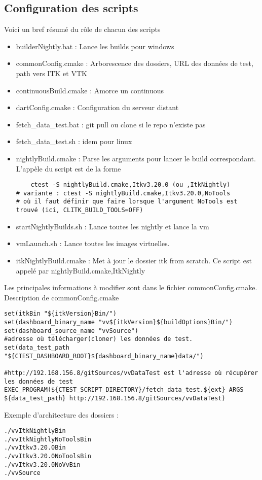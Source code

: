 \documentclass[12pt]{report}
\begin{document}
\subsection{Configuration des scripts}
Voici un bref résumé du rôle de chacun des scripts
\begin{itemize} 
 \item builderNightly.bat : Lance les builds pour windows
 \item commonConfig.cmake : Arborescence des dossiers, URL des données de test, path vers ITK et VTK
 \item continuousBuild.cmake : Amorce un continuous
 \item dartConfig.cmake : Configuration du serveur distant
 \item fetch\_data\_test.bat : git pull ou clone si le repo n'existe pas
 \item fetch\_data\_test.sh : idem pour linux
 \item nightlyBuild.cmake : Parse les arguments pour lancer le build correspondant.
L'appèle du script est de la forme
\begin{verbatim}
	ctest -S nightlyBuild.cmake,Itkv3.20.0 (ou ,ItkNightly)
# variante : ctest -S nightlyBuild.cmake,Itkv3.20.0,NoTools
# où il faut définir que faire lorsque l'argument NoTools est trouvé (ici, CLITK_BUILD_TOOLS=OFF)
\end{verbatim}
 \item startNightlyBuilds.sh : Lance toutes les nightly et lance la vm
 \item vmLaunch.sh : Lance toutes les images virtuelles.
 \item itkNightlyBuild.cmake : Met à jour le dossier itk from scratch. Ce script est appelé par nightlyBuild.cmake,ItkNightly
\end{itemize}

Les principales informations à modifier sont dans le fichier commonConfig.cmake.\\
Description de commonConfig.cmake
\begin{verbatim}
set(itkBin "${itkVersion}Bin/")
set(dashboard_binary_name "vv${itkVersion}${buildOptions}Bin/")
set(dashboard_source_name "vvSource")
#adresse où télécharger(cloner) les données de test.
set(data_test_path "${CTEST_DASHBOARD_ROOT}${dashboard_binary_name}data/") 

#http://192.168.156.8/gitSources/vvDataTest est l'adresse où récupérer les données de test
EXEC_PROGRAM(${CTEST_SCRIPT_DIRECTORY}/fetch_data_test.${ext} ARGS ${data_test_path} http://192.168.156.8/gitSources/vvDataTest)
\end{verbatim}
Exemple d'architecture des dossiers : 
\begin{verbatim}
./vvItkNightlyBin
./vvItkNightlyNoToolsBin
./vvItkv3.20.0Bin
./vvItkv3.20.0NoToolsBin
./vvItkv3.20.0NoVvBin
./vvSource
\end{verbatim}
\end{document}
